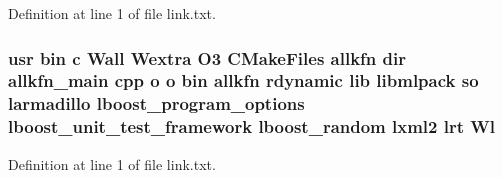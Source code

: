 Definition at line 1 of file link.\-txt.

\subsubsection[{Wl}]{\setlength{\rightskip}{0pt plus 5cm}usr bin c Wall Wextra O3 C\-Make\-Files allkfn dir allkfn\-\_\-main cpp o o bin allkfn rdynamic lib libmlpack so larmadillo lboost\-\_\-program\-\_\-options lboost\-\_\-unit\-\_\-test\-\_\-framework lboost\-\_\-random lxml2 lrt Wl}\label{methods_2neighbor__search_2CMakeFiles_2allkfn_8dir_2link_8txt_a4282af34df09e3260a23305fb2725319}


Definition at line 1 of file link.\-txt.

